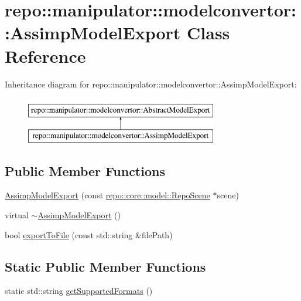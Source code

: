 \hypertarget{classrepo_1_1manipulator_1_1modelconvertor_1_1_assimp_model_export}{}\section{repo\+:\+:manipulator\+:\+:modelconvertor\+:\+:Assimp\+Model\+Export Class Reference}
\label{classrepo_1_1manipulator_1_1modelconvertor_1_1_assimp_model_export}
Inheritance diagram for repo\+:\+:manipulator\+:\+:modelconvertor\+:\+:Assimp\+Model\+Export\+:\begin{figure}[H]
\begin{center}
\leavevmode
\includegraphics[height=2.000000cm]{classrepo_1_1manipulator_1_1modelconvertor_1_1_assimp_model_export}
\end{center}
\end{figure}
\subsection*{Public Member Functions}
\begin{DoxyCompactItemize}
\item 
\hyperlink{classrepo_1_1manipulator_1_1modelconvertor_1_1_assimp_model_export_a8971989a7e2b8d457f81a412ffb3bc0c}{Assimp\+Model\+Export} (const \hyperlink{classrepo_1_1core_1_1model_1_1_repo_scene}{repo\+::core\+::model\+::\+Repo\+Scene} $\ast$scene)
\item 
virtual \hyperlink{classrepo_1_1manipulator_1_1modelconvertor_1_1_assimp_model_export_a2ce15aaa7d4eae90f24354e16d5f7e5b}{$\sim$\+Assimp\+Model\+Export} ()
\item 
bool \hyperlink{classrepo_1_1manipulator_1_1modelconvertor_1_1_assimp_model_export_afdf745f16a3d2f751ae236936111a875}{export\+To\+File} (const std\+::string \&file\+Path)
\end{DoxyCompactItemize}
\subsection*{Static Public Member Functions}
\begin{DoxyCompactItemize}
\item 
static std\+::string \hyperlink{classrepo_1_1manipulator_1_1modelconvertor_1_1_assimp_model_export_ae36fc6ff94ca7e6c86dc5b0f7ee18fba}{get\+Supported\+Formats} ()
\end{DoxyCompactItemize}

